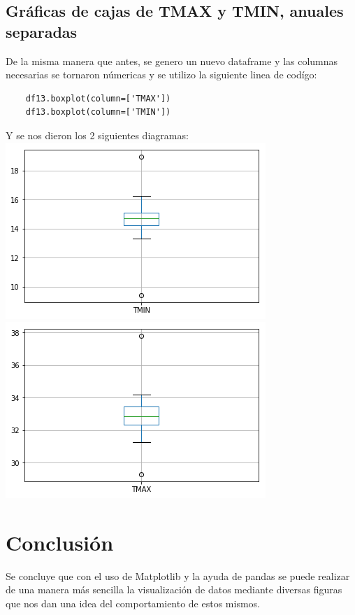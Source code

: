 \documentclass{article}
\begin{document}
\subsection{Gráficas de cajas de TMAX y TMIN, anuales separadas}
De la misma manera que antes, se genero un nuevo dataframe y las columnas necesarias se tornaron númericas y se utilizo la siguiente linea de codígo:
\begin{verbatim}
    df13.boxplot(column=['TMAX'])
    df13.boxplot(column=['TMIN'])
\end{verbatim}
Y se nos dieron los 2 siguientes diagramas: \\
\includegraphics[scale=.7]{cajatminanual.png}
\includegraphics[scale=.7]{cajatmaxanual.png}

\section{Conclusión}
Se concluye que con el uso de Matplotlib y la ayuda de pandas se puede realizar de una manera más sencilla la visualización de datos mediante diversas figuras que nos dan una idea del comportamiento de estos mismos.
\end{document}
